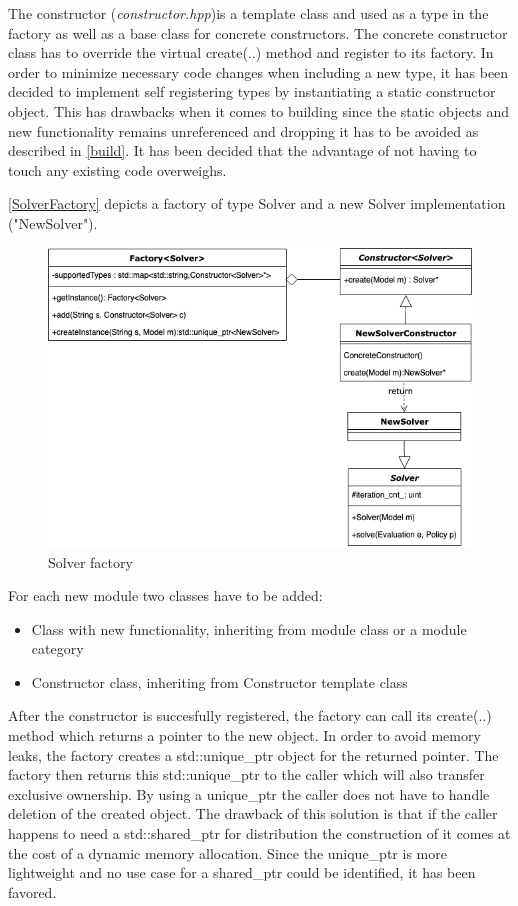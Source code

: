 The constructor (\emph{constructor.hpp})is a template class and used as a type in the factory as well as a base class for concrete constructors. The concrete constructor class has to override the virtual create(..) method and register to its factory.
In order to minimize necessary code changes when including a new type, it has been decided to implement self registering types by instantiating a static constructor object. This has drawbacks when it comes to building since the static objects and new functionality remains unreferenced and dropping it has to be avoided as described in \autoref{build}. 
It has been decided that the advantage of not having to touch any existing code overweighs. 

\autoref{SolverFactory} depicts a factory of type Solver and a new Solver implementation ("NewSolver"). 

\begin{figure}[ht]
	\centering
	\includegraphics[width=.6\textwidth]{images/SolverFactory.png}
	\caption{\label{fig:bild2}Solver factory}
	\label{SolverFactory}
\end{figure}

For each new module two classes have to be added:

\begin{itemize}
	\item Class with new functionality, inheriting from module class or a module category
	\item Constructor class, inheriting from Constructor template class
\end{itemize}

After the constructor is succesfully registered, the factory can call its create(..) method which returns a pointer to the new object. In order to avoid memory leaks, the factory creates a std::unique\_ptr object for the returned pointer. The factory then returns this std::unique\_ptr to the caller which will also transfer exclusive ownership. By using a unique\_ptr the caller does not have to handle deletion of the created object. The drawback of this solution is that if the caller happens to need a std::shared\_ptr for distribution the construction of it comes at the cost of a dynamic memory allocation. 
Since the unique\_ptr is more lightweight and no use case for a shared\_ptr could be identified, it has been favored. 

